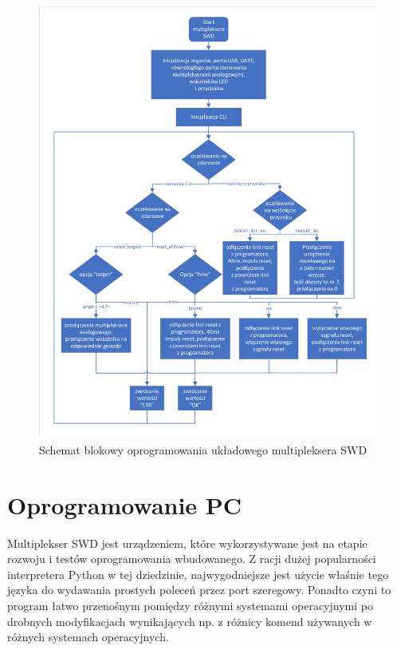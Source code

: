 \begin{center}
\begin{figure}[H]
\centering
\includegraphics[width=0.72\paperwidth]{images/Mux_blokowy_soft.pdf}
\caption{Schemat blokowy oprogramowania układowego multipleksera SWD}
\label{SWD_MUX_software_block_diagram}
\end{figure}
\end{center}



\section {Oprogramowanie PC}
Multiplekser SWD jest urządzeniem, które wykorzystywane jest na etapie rozwoju i testów oprogramowania wbudowanego. Z racji dużej popularności interpretera Python w tej dziedzinie, najwygodniejsze jest użycie właśnie tego języka do wydawania prostych poleceń przez port szeregowy. Ponadto czyni to program łatwo przenośnym pomiędzy różnymi systemami operacyjnymi po drobnych modyfikacjach wynikających np. z różnicy komend używanych w różnych systemach operacyjnych.

